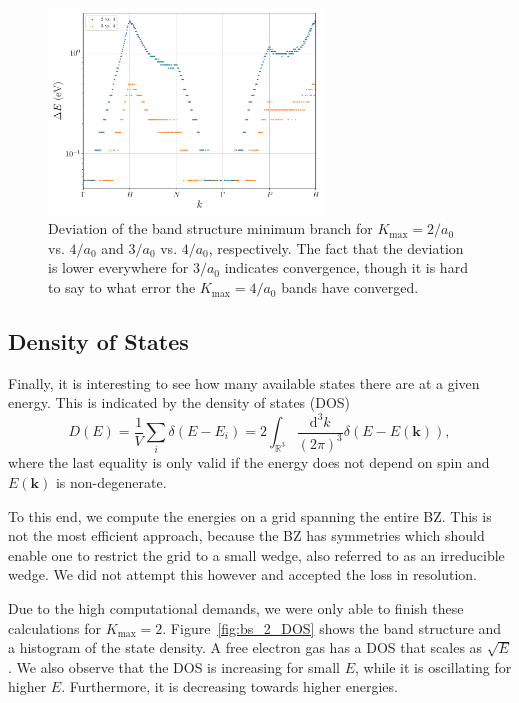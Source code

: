 \documentclass[a4paper,DIV=12,english]{scrartcl}
\begin{document}
\begin{figure}
    \centering 
    \includegraphics[width=0.65\textwidth]{../plots/conv_24.pdf}
    \caption{Deviation of the band structure minimum branch for $K_\text{max} = 2/a_0$ vs. $4/a_0$ and $3/a_0$ vs. $4/a_0$, respectively. The fact that the deviation is lower everywhere for $3/a_0$ indicates convergence, though it is hard to say to what error the $K_\text{max} = 4/a_0$ bands have converged.}
    \label{fig:conv}
\end{figure}

\FloatBarrier
\subsection{Density of States}
Finally, it is interesting to see how many available states there are at a given energy. This is indicated by the density of states (DOS)
\begin{equation}
    D(E) = \frac{1}{V} \sum_i \delta(E - E_i) = 2\int_{\mathbb{R}^3} \frac{\text{d}^3k}{(2\pi)^3}\delta(E-E(\textbf{k})),
\end{equation}
where the last equality is only valid if the energy does not depend on spin and $E(\textbf{k})$ is non-degenerate.

To this end, we compute the energies on a grid spanning the entire BZ. This is not the most efficient approach, because the BZ has symmetries which should enable one to restrict the grid to a small wedge, also referred to as an irreducible wedge. We did not attempt this however and accepted the loss in resolution.

Due to the high computational demands, we were only able to finish these calculations for $K_\text{max}=2$. Figure~\ref{fig:bs_2_DOS} shows the band structure and a histogram of the state density. A free electron gas has a DOS that scales as $\sqrt{E}$. We also observe that the DOS is increasing for small $E$, while it is oscillating for higher $E$. Furthermore, it is decreasing towards higher energies. 
\end{document}
